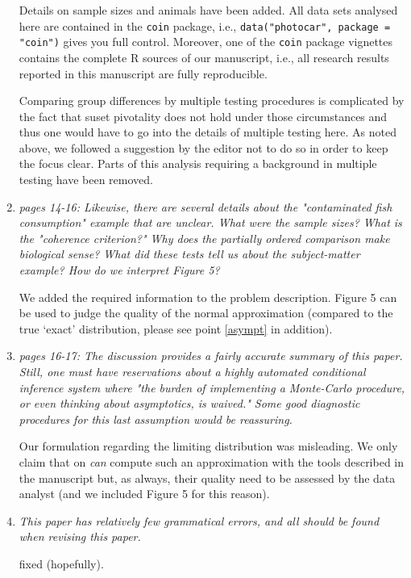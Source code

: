 \documentclass[11pt]{article}
\begin{document}
\begin{enumerate}
Details on sample sizes and animals have been added. All data sets analysed
here are contained in the \texttt{coin} package, i.e., \texttt{data("photocar", package =
"coin")} gives you full control. Moreover, one of the \texttt{coin} package
vignettes contains the complete \textsf{R} sources of our manuscript, i.e.,
all research results reported in this manuscript are fully reproducible.

Comparing group differences by multiple testing procedures is complicated by
the fact that suset pivotality does not hold under those circumstances and
thus one would have to go into the details of multiple testing here. As
noted above, we followed a suggestion by the editor not to do so in order to
keep the focus clear. Parts of this analysis requiring a background in
multiple testing have been removed.

\item \textsl{pages 14-16:  Likewise, there are several details about the "contaminated fish 
              consumption" example that are unclear. What were the sample sizes? What is the 
              "coherence criterion?" Why does the partially ordered comparison make biological 
              sense? What did these tests tell us about the subject-matter example? How do we 
              interpret Figure 5? }

We added the required information to the problem description. Figure 5 can
be used to judge the quality of the normal approximation (compared to the
true `exact' distribution, please see point \ref{asympt} in addition).
 
\item \textsl{pages 16-17:  The discussion provides a fairly accurate summary of this paper. 
              Still, one must have reservations about a highly automated conditional inference 
              system where "the burden of implementing a Monte-Carlo procedure, or even thinking 
              about asymptotics, is waived." Some good diagnostic procedures for this last 
              assumption would be reassuring. }
 
Our formulation regarding the limiting distribution was misleading.
We only claim that on \textit{can} compute such an approximation with the
tools described in the manuscript but, as always, their quality need to be
assessed by the data analyst (and we included Figure 5 for this reason).

\item \textsl{This paper has relatively few grammatical errors, and all should be found when 
              revising this paper.}

fixed (hopefully).

\end{enumerate}



\end{document}
